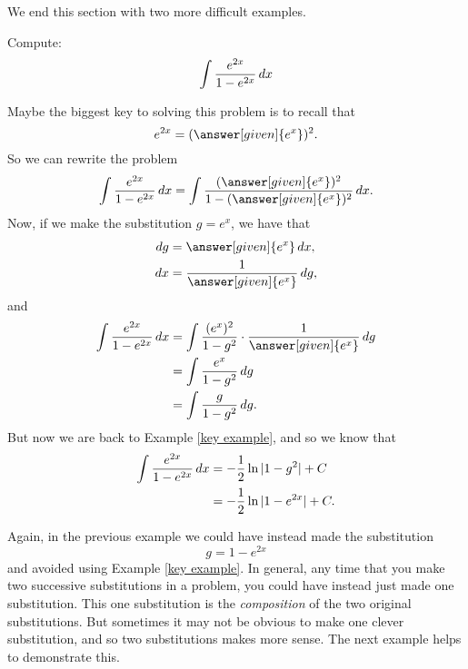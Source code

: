 \documentclass{ximera}
\begin{document}
We end this section with two more difficult examples.



\begin{example}
Compute:
\[
\int \frac{e^{2x}}{1 - e^{2x}} \mathop{}\!d x
\]
\begin{explanation}
Maybe the biggest key to solving this problem is to recall that
\[
e^{2x} = (\answer[given]{e^x})^2.
\]
So we can rewrite the problem
\[
\int \frac{e^{2x}}{1 - e^{2x}} \d x = \int \frac{(\answer[given]{e^x})^2}{1 - (\answer[given]{e^x})^2} \d x.
\]
Now, if we make the substitution $g = e^x$, we have that
\begin{align*}
\d g &= \answer[given]{e^x} \d x,\\
\d x &= \frac{1}{\answer[given]{e^x}} \d g,
\end{align*}
and
\begin{align*}
\int \frac{e^{2x}}{1 - e^{2x}} \d x &= \int \frac{(e^x)^2}{1 - g^2} \cdot \frac{1}{\answer[given]{e^x}} \d g  \\
&= \int \frac{e^x}{1-g^2} \d g  \\
&= \int \frac{g}{1-g^2} \d g.
\end{align*}
But now we are back to Example \ref{key example}, and so we know that
\begin{align*}
\int \frac{e^{2x}}{1 - e^{2x}} \mathop{}\!d x &= - \frac{1}{2} \ln|1-g^2| + C  \\
&= - \frac{1}{2} \ln|1 - e^{2x}| + C.
\end{align*}
\end{explanation}
\end{example}


Again, in the previous example we could have instead made the substitution 
\[
g = 1 - e^{2x}
\]
and avoided using Example \ref{key example}.  
In general, any time that you make two successive substitutions in a problem, you could have instead just made one substitution.  
This one substitution is the \textit{composition} of the two original substitutions.  
But sometimes it may not be obvious to make one clever substitution, and so two substitutions makes more sense.  
The next example helps to demonstrate this.
\end{document}

